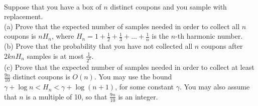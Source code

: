 \documentclass{article}
\begin{document}
\bigskip

\\
Suppose that you have a box of $n$ distinct coupons and you sample with replacement.\\
(a) Prove that the expected number of samples needed in order to collect all $n$ coupons is $n H_n$, 
where $H_n=1+\frac{1}{2}+ \frac{1}{3} + \ldots + \frac{1}{n}$ is the $n$-th harmonic number.\\
(b) Prove that the probability that you have not collected all $n$ coupons after 
$2kn H_n$ samples is at most $\frac{1}{2^k}$. \\
(c) Prove that the expected number of samples needed in order to collect at least $\frac{9n}{10}$ 
distinct coupons is $O(n)$. You may use the bound $\gamma + \log n < H_n < \gamma + \log (n+1)$, 
for some constant $\gamma$. You may also assume that $n$ is a multiple of 10, so that 
 $\frac{9n}{10}$ is an integer.\\
\end{document}
